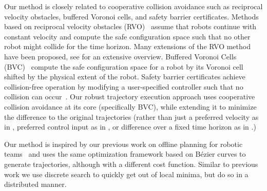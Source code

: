 \documentclass{svproc}
\begin{document}
Our method is closely related to cooperative collision avoidance such as reciprocal velocity obstacles, buffered Voronoi cells, and safety barrier certificates.
Methods based on reciprocal velocity obstacles (RVO)~\cite{RVO} assume that robots continue with constant velocity and compute the safe configuration space such that no other robot might collide for the time horizon.
Many extensions of the RVO method have been proposed, see \cite{epsilonCCA} for an extensive overview.
Buffered Voronoi Cells (BVC)~\cite{bufferedVoronoiCells} compute the safe configuration space for a robot by its Voronoi cell shifted by the physical extent of the robot. 
Safety barrier certificates achieve collision-free operation by modifying a user-specified controller such that no collision can occur~\cite{barrierCertificates}.
Our robust trajectory execution approach uses cooperative collision avoidance at its core (specifically BVC), while extending it to minimize the difference to the original trajectories (rather than just a preferred velocity as in \cite{epsilonCCA}, preferred control input as in \cite{barrierCertificates}, or difference over a fixed time horizon as in \cite{bufferedVoronoiCells}.)

Our method is inspired by our previous work on offline planning for robotic teams~\cite{crazyplanning-ieeetro} and uses the same optimization framework based on B\'ezier curves to generate trajectories, although with a different cost function.
Similar to previous work we use discrete search to quickly get out of local minima, but do so in a distributed manner.
\end{document}
